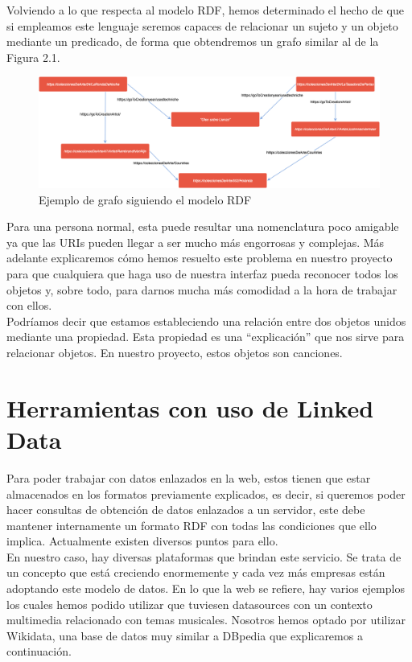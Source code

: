 Volviendo a lo que respecta al modelo RDF, hemos determinado el hecho de que si empleamos este lenguaje seremos capaces de relacionar un sujeto y un objeto mediante un predicado, de forma que obtendremos un grafo similar al de la Figura 2.1.\\

\begin{figure}[h!]
	\centering
	\includegraphics[width = 1\textwidth]{Imagenes/Bitmap/RDFexample.png}
	\caption{Ejemplo de grafo siguiendo el modelo RDF}
	\label{fig:sampleImage}
\end{figure}

Para una persona normal, esta puede resultar una nomenclatura poco amigable ya que las URIs pueden llegar a ser mucho más engorrosas y complejas. Más adelante explicaremos cómo hemos resuelto este problema en nuestro proyecto para que cualquiera que haga uso de nuestra interfaz pueda reconocer todos los objetos y, sobre todo, para darnos mucha más comodidad a la hora de trabajar con ellos.\\

Podríamos decir que estamos estableciendo una relación entre dos objetos unidos mediante una propiedad. Esta propiedad es una ``explicación'' que nos sirve para relacionar objetos. En nuestro proyecto, estos objetos son canciones.\\


\section{Herramientas con uso de Linked Data}

Para poder trabajar con datos enlazados en la web, estos tienen que estar almacenados en los formatos previamente explicados, es decir, si queremos poder hacer consultas de obtención de datos enlazados a un servidor, este debe mantener internamente un formato RDF con todas las condiciones que ello implica. Actualmente existen diversos puntos para ello.\\

En nuestro caso, hay diversas plataformas que brindan este servicio. Se trata de un concepto que está creciendo enormemente y cada vez más empresas están adoptando este modelo de datos. En lo que la web se refiere, hay varios ejemplos los cuales hemos podido utilizar que tuviesen datasources con un contexto multimedia relacionado con temas musicales. Nosotros hemos optado por utilizar Wikidata, una base de datos muy similar a DBpedia que explicaremos a continuación.


